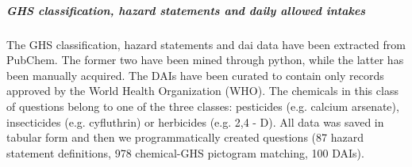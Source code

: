 \subparagraph{GHS classification, hazard statements and daily allowed intakes}

The GHS classification, hazard statements and  \gls{dai} data have been extracted from PubChem. \cite{pubchem}
The former two have been mined through python, while the latter has been manually acquired.
The DAIs have been curated to contain only records approved by the World Health Organization (WHO). 
The chemicals in this class of questions belong to one of the three classes: pesticides (e.g. calcium arsenate), insecticides (e.g. cyfluthrin) or herbicides (e.g. 2,4 - D). 
All data was saved in tabular form and then we programmatically created questions (87 hazard statement definitions, 978 chemical-GHS pictogram matching, 100 DAIs).
